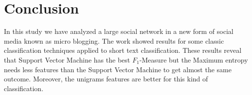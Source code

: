 
\chapter{Conclusion} %

\label{Chapter5} %



In this study we have analyzed a large social network in a
new form of social media known as micro blogging. 
The work showed results for some classic classification techniques applied to short text classification.
These results reveal that Support Vector Machine has the best $F_1$-Measure but the Maximum entropy needs less features than the Support Vector Machine to get almost the same outcome. Moreover, the unigrams features are better for this kind of classification.
\newpage